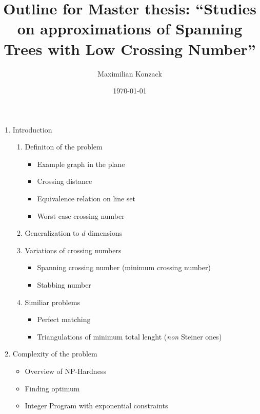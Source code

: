 \documentclass[a4paper,pagesize]{scrartcl}
\title{Outline for Master thesis: ``Studies on approximations of Spanning Trees
with Low Crossing Number''}
\author{Maximilian Konzack}
\date{\today}
\begin{document}
	\maketitle
    \begin{enumerate}
        \item Introduction
            \begin{enumerate}
                \item Definiton of the problem
                    \begin{itemize}
                        \item Example graph in the plane
                        \item Crossing distance
                        \item Equivalence relation on line set
                        \item Worst case crossing number
                    \end{itemize}
                \item Generalization to $d$ dimensions
                \item Variations of crossing numbers
                    \begin{itemize}
                        \item Spanning crossing number (minimum crossing
                            number)
                        \item Stabbing number
                    \end{itemize}
                \item Similiar problems
                    \begin{itemize}
                        \item Perfect matching
                        \item Triangulations of minimum total lenght
                            (\emph{non} Steiner ones)
                    \end{itemize}
            \end{enumerate}

        \item Complexity of the problem
            \begin{itemize}
                \item Overview of NP-Hardness
                \item Finding optimum
                \item Integer Program with exponential constraints
            \end{itemize}


\end{enumerate}
\end{document}
